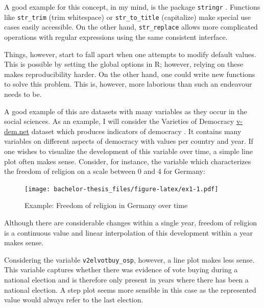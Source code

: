 \documentclass[]{report}
\newenvironment{Shaded}{\begin{snugshade}}{\end{snugshade}}
\newcommand{\KeywordTok}[1]{\textcolor[rgb]{0.13,0.29,0.53}{\textbf{#1}}}
\newcommand{\StringTok}[1]{\textcolor[rgb]{0.31,0.60,0.02}{#1}}
\newcommand{\OperatorTok}[1]{\textcolor[rgb]{0.81,0.36,0.00}{\textbf{#1}}}
\newcommand{\NormalTok}[1]{#1}
\theoremstyle{definition}
\theoremstyle{definition}
\theoremstyle{definition}
\theoremstyle{remark}
\begin{document}
A good example for this concept, in my mind, is the package
\texttt{stringr} \citep{stringr}. Functions like \texttt{str\_trim}
(trim whitespace) or \texttt{str\_to\_title} (capitalize) make special
use cases easily accessible. On the other hand, \texttt{str\_replace}
allows more complicated operations with regular expressions using the
same consistent interface.

Things, however, start to fall apart when one attempts to modify default
values. This is possible by setting the global options in R; however,
relying on these makes reproducibility harder. On the other hand, one
could write new functions to solve this problem. This is, however, more
laborious than such an endeavour needs to be.

A good example of this are datasets with many variables as they occur in
the social sciences. As an example, I will consider the Varieties of
Democracy \href{V-DEM}{v-dem.net} dataset which produces indicators of
democracy \citep[\citet{Pemstein2018}]{vdem2018}. It contains many
variables on different aspects of democracy with values per country and
year. If one wishes to visualize the development of this variable over
time, a simple line plot often makes sense. Consider, for instance, the
variable which characterizes the freedom of religion on a scale between
0 and 4 for Germany:

\begin{Shaded}
\end{Shaded}

\begin{figure}
\centering
\texttt{[image: bachelor-thesis\_files/figure-latex/ex1-1.pdf]}
\caption{\label{fig:ex1}Example: Freedom of religion in Germany over time}
\end{figure}

Although there are considerable changes within a single year, freedom of
religion is a continuous value and linear interpolation of this
development within a year makes sense.

Considering the variable \texttt{v2elvotbuy\_osp}, however, a line plot
makes less sense. This variable captures whether there was evidence of
vote buying during a national election and is therefore only present in
years where there has been a national election. A step plot seems more
sensible in this case as the represented value would always refer to the
last election.
\end{document}
